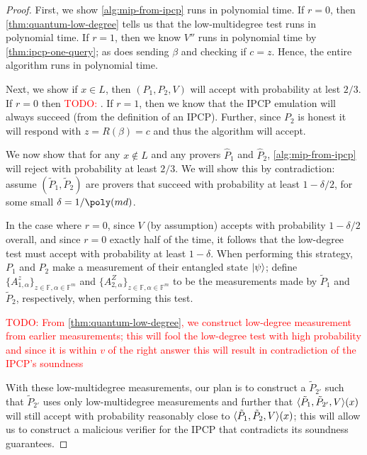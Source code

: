 \documentclass[english,12pt]{reedthesis}
\theoremstyle{plain}
\theoremstyle{definition}
\theoremstyle{remark}
\DeclarePairedDelimiter{\ang}{\langle}{\rangle}
\DeclarePairedDelimiter\ket{\lvert}{\rangle}
\newcommand{\TODO}[1]{\textcolor{red}{TODO: #1}}
\begin{document}
\begin{proof}
  First, we show \cref{alg:mip-from-ipcp} runs in polynomial time. If $r = 0$,
  then \cref{thm:quantum-low-degree} tells us that the low-multidegree test runs
  in polynomial time. If $r = 1$, then we know $V''$ runs in polynomial time by
  \cref{thm:ipcp-one-query}; as does sending $\beta$ and checking if $c = z$. Hence,
  the entire algorithm runs in polynomial time.

  Next, we show if $x \in L$, then $(P_{1}, P_{2}, V)$ will accept with
  probability at lest $2/3$. If $r = 0$ then \TODO{}. If $r = 1$, then we know
  that the IPCP emulation will always succeed (from the definition of an IPCP).
  Further, since $P_{2}$ is honest it will respond with $z = R(\beta) = c$ and thus
  the algorithm will accept.

  We now show that for any $x \notin L$ and any provers $\hat{P}_{1}$ and
  $\hat{P}_{2}$, \cref{alg:mip-from-ipcp} will reject with probability at least
  $2/3$. We will show this by contradiction: assume
  $(\tilde{P}_{1}, \tilde{P}_{2})$ are provers that succeed with probability at
  least $1 - \delta/2$, for some small $\delta = 1/\poly(md)$.

  In the case where $r = 0$, since $V$ (by assumption) accepts with probability
  $1 - \delta/2$ overall, and since $r = 0$ exactly half of the time, it follows that
  the low-degree test must accept with probability at least $1 - \delta$. When
  performing this strategy, $P_{1}$ and $P_{2}$ make a measurement of their
  entangled state $\ket{\psi}$; define
  $\{A_{1,\alpha}^{z}\}_{z \in \mathbb{F},\alpha \in \mathbb{F}^{m}}$ and
  $\{A_{2,\alpha}^{Z}\}_{z \in \mathbb{F},\alpha \in \mathbb{F}^{m}}$ to be the measurements
  made by $\tilde{P}_{1}$ and $\tilde{P}_{2}$, respectively, when performing
  this test.

  \TODO{From \cref{thm:quantum-low-degree}, we construct low-degree measurement
    from earlier measurements; this will fool the low-degree test with high
    probability and since it is within $v$ of the right answer this will result
    in contradiction of the IPCP's soundness}

  With these low-multidegree measurements, our plan is to construct a
  $\tilde{P}_{2'}$ such that $\tilde{P}_{2'}$ uses only low-multidegree
  measurements and further that $\ang{\tilde{P}_{1}, \tilde{P}_{2'}, V}(x)$ will
  still accept with probability reasonably close to
  $\ang{\tilde{P}_{1}, \tilde{P}_{2}, V}(x)$; this will allow us to construct a
  malicious verifier for the IPCP that contradicts its soundness guarantees.


\end{proof}
\end{document}
